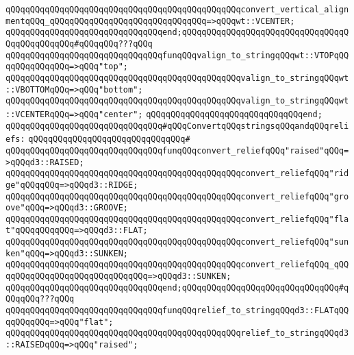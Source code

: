\verb|qQQqqQQqqQQqqQQqqQQqqQQqqQQqqQQqqQQqqQQqqQQqqQQqconvert_vertical_alignmentqQQq_qQQqqQQqqQQqqQQqqQQqqQQqqQQqqQQq=>qQQqwt::VCENTER;|\newline
\verb|qQQqqQQqqQQqqQQqqQQqqQQqqQQqqQQqend;qQQqqQQqqQQqqQQqqQQqqQQqqQQqqQQqqQQqqQQqqQQqqQQq#qQQqqQQq???qQQq|\newline
\newline
\verb|qQQqqQQqqQQqqQQqqQQqqQQqqQQqqQQqfunqQQqvalign_to_stringqQQqwt::VTOPqQQqqQQqqQQqqQQq=>qQQq"top";|\newline
\verb|qQQqqQQqqQQqqQQqqQQqqQQqqQQqqQQqqQQqqQQqqQQqqQQqvalign_to_stringqQQqwt::VBOTTOMqQQq=>qQQq"bottom";|\newline
\verb|qQQqqQQqqQQqqQQqqQQqqQQqqQQqqQQqqQQqqQQqqQQqqQQqvalign_to_stringqQQqwt::VCENTERqQQq=>qQQq"center";|\newline
\verb|qQQqqQQqqQQqqQQqqQQqqQQqqQQqqQQqend;|\newline
\newline
\verb|qQQqqQQqqQQqqQQqqQQqqQQqqQQqqQQq#qQQqConvertqQQqstringsqQQqandqQQqreliefs:|\newline
\verb|qQQqqQQqqQQqqQQqqQQqqQQqqQQqqQQq#|\newline
\verb|qQQqqQQqqQQqqQQqqQQqqQQqqQQqqQQqfunqQQqconvert_reliefqQQq"raised"qQQq=>qQQqd3::RAISED;|\newline
\verb|qQQqqQQqqQQqqQQqqQQqqQQqqQQqqQQqqQQqqQQqqQQqqQQqconvert_reliefqQQq"ridge"qQQqqQQq=>qQQqd3::RIDGE;|\newline
\verb|qQQqqQQqqQQqqQQqqQQqqQQqqQQqqQQqqQQqqQQqqQQqqQQqconvert_reliefqQQq"groove"qQQq=>qQQqd3::GROOVE;|\newline
\verb|qQQqqQQqqQQqqQQqqQQqqQQqqQQqqQQqqQQqqQQqqQQqqQQqconvert_reliefqQQq"flat"qQQqqQQqqQQq=>qQQqd3::FLAT;|\newline
\verb|qQQqqQQqqQQqqQQqqQQqqQQqqQQqqQQqqQQqqQQqqQQqqQQqconvert_reliefqQQq"sunken"qQQq=>qQQqd3::SUNKEN;|\newline
\verb|qQQqqQQqqQQqqQQqqQQqqQQqqQQqqQQqqQQqqQQqqQQqqQQqconvert_reliefqQQq_qQQqqQQqqQQqqQQqqQQqqQQqqQQqqQQq=>qQQqd3::SUNKEN;|\newline
\verb|qQQqqQQqqQQqqQQqqQQqqQQqqQQqqQQqend;qQQqqQQqqQQqqQQqqQQqqQQqqQQqqQQq#qQQqqQQq???qQQq|\newline
\newline
\verb|qQQqqQQqqQQqqQQqqQQqqQQqqQQqqQQqfunqQQqrelief_to_stringqQQqd3::FLATqQQqqQQqqQQq=>qQQq"flat";|\newline
\verb|qQQqqQQqqQQqqQQqqQQqqQQqqQQqqQQqqQQqqQQqqQQqqQQqrelief_to_stringqQQqd3::RAISEDqQQq=>qQQq"raised";|\newline

